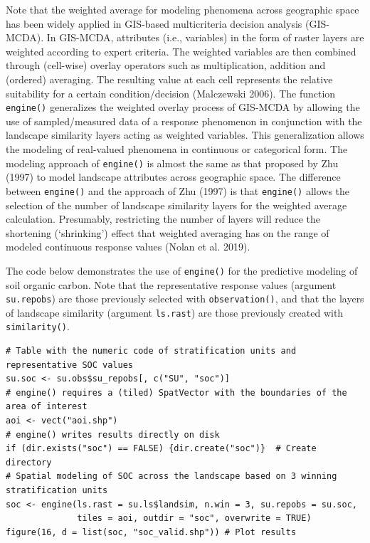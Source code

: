 Note that the weighted average for modeling phenomena across geographic space
has been widely applied in GIS-based multicriteria decision analysis (GIS-MCDA).
In GIS-MCDA, attributes (i.e., variables) in the form of raster layers are
weighted according to expert criteria. The weighted variables are then combined
through (cell-wise) overlay operators such as multiplication, addition and
(ordered) averaging. The resulting value at each cell represents the relative
suitability for a certain condition/decision (Malczewski 2006). The function
\texttt{engine()} generalizes the weighted overlay process of GIS-MCDA by allowing the
use of sampled/measured data of a response phenomenon in conjunction with the
landscape similarity layers acting as weighted variables. This generalization
allows the modeling of real-valued phenomena in continuous or categorical form.
The modeling approach of \texttt{engine()} is almost the same as that proposed by
Zhu (1997) to model landscape attributes across geographic space. The difference
between \texttt{engine()} and the approach of Zhu (1997) is that \texttt{engine()} allows
the selection of the number of landscape similarity layers for the weighted
average calculation. Presumably, restricting the number of layers will reduce
the shortening (`shrinking') effect that weighted averaging has on the range of
modeled continuous response values (Nolan et al. 2019).

The code below demonstrates the use of \texttt{engine()} for the predictive modeling of
soil organic carbon. Note that the representative response values (argument
\texttt{su.repobs}) are those previously selected with \texttt{observation()}, and that the
layers of landscape similarity (argument \texttt{ls.rast}) are those previously created
with \texttt{similarity()}.

\begin{verbatim}
# Table with the numeric code of stratification units and representative SOC values
su.soc <- su.obs$su_repobs[, c("SU", "soc")]
# engine() requires a (tiled) SpatVector with the boundaries of the area of interest
aoi <- vect("aoi.shp")
# engine() writes results directly on disk
if (dir.exists("soc") == FALSE) {dir.create("soc")}  # Create directory
# Spatial modeling of SOC across the landscape based on 3 winning stratification units
soc <- engine(ls.rast = su.ls$landsim, n.win = 3, su.repobs = su.soc,
              tiles = aoi, outdir = "soc", overwrite = TRUE)
figure(16, d = list(soc, "soc_valid.shp")) # Plot results
\end{verbatim}

